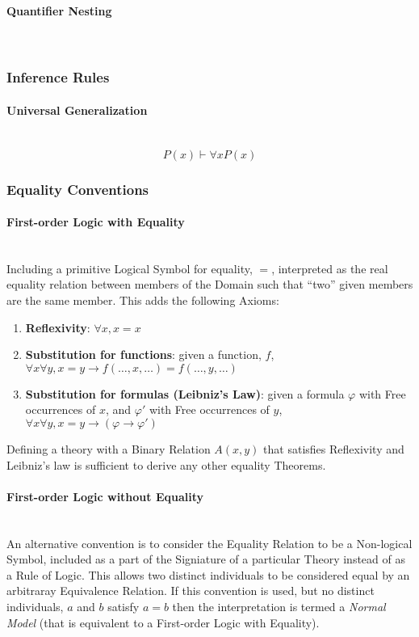 \documentclass{article}
\begin{document}
\paragraph{Quantifier Nesting}\hfill
\\

\subsubsection{Inference Rules}

\paragraph{Universal Generalization}\label{subsec:universal_generalization} \hfill
\\
\[P(x) \vdash \forall x P(x)\]

\subsubsection{Equality Conventions}\label{subsec:first_order_equality}

\paragraph{First-order Logic with Equality}\hfill
\\ Including a primitive Logical Symbol for equality, $=$, interpreted
as the real equality relation between members of the Domain such that
``two'' given members are the same member. This adds the following
Axioms:

\begin{enumerate}
\item \textbf{Reflexivity}: $\forall x, x=x$
\item \textbf{Substitution for functions}: given a function, $f$,
  $\forall x \forall y, x = y \rightarrow f(\ldots,x,\ldots) =
  f(\ldots,y,\ldots)$
\item \textbf{Substitution for formulas (Leibniz's Law)}: given a
  formula $\varphi$ with Free occurrences of $x$, and $\varphi '$ with
  Free occurrences of $y$, $\forall x \forall y, x = y \rightarrow
  (\varphi \rightarrow \varphi ')$
\end{enumerate}

Defining a theory with a Binary Relation $A(x,y)$ that satisfies
Reflexivity and Leibniz's law is sufficient to derive any other
equality Theorems.

\paragraph{First-order Logic without Equality} \hfill
\\ An alternative convention is to consider the Equality Relation to
be a Non-logical Symbol, included as a part of the Signiature of a
particular Theory instead of as a Rule of Logic. This allows two
distinct individuals to be considered equal by an arbitraray
Equivalence Relation. If this convention is used, but no distinct
individuals, $a$ and $b$ satisfy $a=b$ then the interpretation is
termed a \emph{Normal Model} (that is equivalent to a First-order
Logic with Equality).
\end{document}
